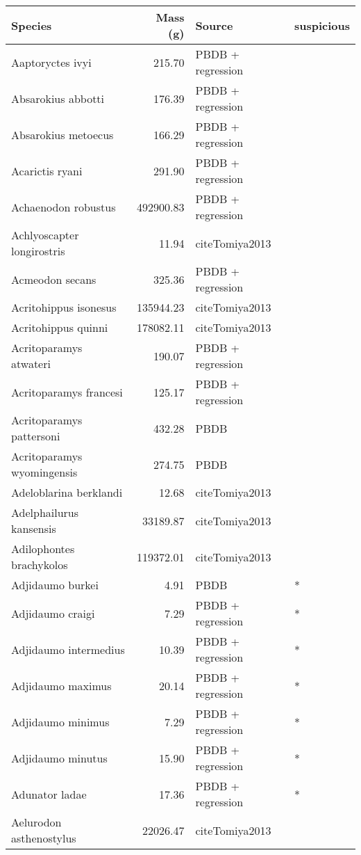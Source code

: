 \begin{table}[ht]
\centering
\begin{tabular}{lrll}
  \hline
Species & Mass (g) & Source & suspicious \\ 
  \hline
Aaptoryctes ivyi & 215.70 & PBDB + regression &  \\ 
  Absarokius abbotti & 176.39 & PBDB + regression &  \\ 
  Absarokius metoecus & 166.29 & PBDB + regression &  \\ 
  Acarictis ryani & 291.90 & PBDB + regression &  \\ 
  Achaenodon robustus & 492900.83 & PBDB + regression &  \\ 
  Achlyoscapter longirostris & 11.94 & cite{Tomiya2013} &  \\ 
  Acmeodon secans & 325.36 & PBDB + regression &  \\ 
  Acritohippus isonesus & 135944.23 & cite{Tomiya2013} &  \\ 
  Acritohippus quinni & 178082.11 & cite{Tomiya2013} &  \\ 
  Acritoparamys atwateri & 190.07 & PBDB + regression &  \\ 
  Acritoparamys francesi & 125.17 & PBDB + regression &  \\ 
  Acritoparamys pattersoni & 432.28 & PBDB &  \\ 
  Acritoparamys wyomingensis & 274.75 & PBDB &  \\ 
  Adeloblarina berklandi & 12.68 & cite{Tomiya2013} &  \\ 
  Adelphailurus kansensis & 33189.87 & cite{Tomiya2013} &  \\ 
  Adilophontes brachykolos & 119372.01 & cite{Tomiya2013} &  \\ 
  Adjidaumo burkei & 4.91 & PBDB & * \\ 
  Adjidaumo craigi & 7.29 & PBDB + regression & * \\ 
  Adjidaumo intermedius & 10.39 & PBDB + regression & * \\ 
  Adjidaumo maximus & 20.14 & PBDB + regression & * \\ 
  Adjidaumo minimus & 7.29 & PBDB + regression & * \\ 
  Adjidaumo minutus & 15.90 & PBDB + regression & * \\ 
  Adunator ladae & 17.36 & PBDB + regression & * \\ 
  Aelurodon asthenostylus & 22026.47 & cite{Tomiya2013} &  \\ 

\end{tabular}
\end{table}
